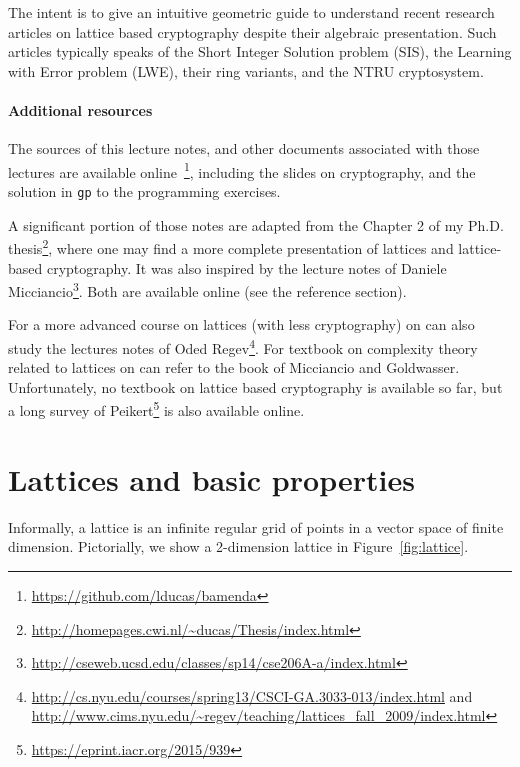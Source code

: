 \documentclass[12pt]{article}
\begin{document}
The intent is to give an intuitive geometric guide to understand recent research articles on lattice based cryptography despite their algebraic presentation. Such articles typically speaks of the Short Integer Solution problem (SIS), the Learning with Error problem (LWE), their ring variants, and the NTRU cryptosystem. 

\paragraph{Additional resources}

The sources of this lecture notes, and other documents associated with those lectures are available online~\footnote{\url{https://github.com/lducas/bamenda}}, including the slides on cryptography, and the solution in \texttt{gp} to the programming exercises.

A significant portion of those notes are adapted from the Chapter 2 of my Ph.D. thesis\footnote{\url{http://homepages.cwi.nl/~ducas/Thesis/index.html}}, where one may find a more complete presentation of lattices and lattice-based cryptography. It was also inspired by the lecture notes of Daniele Micciancio\footnote{\url{http://cseweb.ucsd.edu/classes/sp14/cse206A-a/index.html}}. Both are available online (see the reference section). 

For a more advanced course on lattices (with less cryptography) on can also study the lectures notes of Oded Regev\footnote{\url{http://cs.nyu.edu/courses/spring13/CSCI-GA.3033-013/index.html} and \url{http://www.cims.nyu.edu/~regev/teaching/lattices_fall_2009/index.html}}. For textbook on complexity theory related to lattices on can refer to the book of  Micciancio and Goldwasser. Unfortunately, no textbook on lattice based cryptography is available so far, but a long survey of Peikert\footnote{\url{https://eprint.iacr.org/2015/939}} is also available online.


\section{Lattices and basic properties}

Informally, a lattice is an infinite regular grid of points in a vector space of finite dimension. Pictorially, we show a 2-dimension lattice in Figure~\ref{fig:lattice}.
\end{document}
